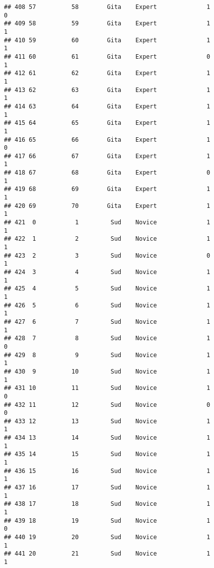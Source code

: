 \documentclass[
]{article}
\begin{document}
\begin{verbatim}
## 408 57          58        Gita    Expert              1                 0
## 409 58          59        Gita    Expert              1                 1
## 410 59          60        Gita    Expert              1                 1
## 411 60          61        Gita    Expert              0                 1
## 412 61          62        Gita    Expert              1                 1
## 413 62          63        Gita    Expert              1                 1
## 414 63          64        Gita    Expert              1                 1
## 415 64          65        Gita    Expert              1                 1
## 416 65          66        Gita    Expert              1                 0
## 417 66          67        Gita    Expert              1                 1
## 418 67          68        Gita    Expert              0                 1
## 419 68          69        Gita    Expert              1                 1
## 420 69          70        Gita    Expert              1                 1
## 421  0           1         Sud    Novice              1                 1
## 422  1           2         Sud    Novice              1                 1
## 423  2           3         Sud    Novice              0                 1
## 424  3           4         Sud    Novice              1                 1
## 425  4           5         Sud    Novice              1                 1
## 426  5           6         Sud    Novice              1                 1
## 427  6           7         Sud    Novice              1                 1
## 428  7           8         Sud    Novice              1                 0
## 429  8           9         Sud    Novice              1                 1
## 430  9          10         Sud    Novice              1                 1
## 431 10          11         Sud    Novice              1                 0
## 432 11          12         Sud    Novice              0                 0
## 433 12          13         Sud    Novice              1                 1
## 434 13          14         Sud    Novice              1                 1
## 435 14          15         Sud    Novice              1                 1
## 436 15          16         Sud    Novice              1                 1
## 437 16          17         Sud    Novice              1                 1
## 438 17          18         Sud    Novice              1                 1
## 439 18          19         Sud    Novice              1                 0
## 440 19          20         Sud    Novice              1                 1
## 441 20          21         Sud    Novice              1                 1

\end{verbatim}
\end{document}
